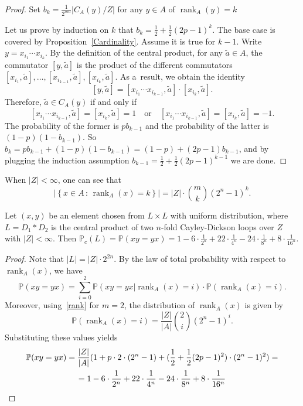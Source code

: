 \documentclass{jonasart}
\begin{document}
	\begin{proof}
		Set $b_k =\frac{1}{2^{mn}}|C_A (y)/Z|$ for any $y \in A$ of $\operatorname{rank}_A (y) = k$

		Let us prove by induction on $k$ that $b_k =\frac{1}{2}+\frac{1}{2}(2p-1)^k$. The base case is covered by Proposition~\ref{Cardinality}. Assume it is true for $k-1$. Write $y = x_{i_1}\cdots x_{i_k}$. By the definition of the central product, for any $\tilde{a} \in A$, the commutator $[y,\tilde{a}]$ is the product of the different commutators $[x_{i_1},\tilde{a}],\dots,[x_{i_{k-1}},\tilde{a}],[x_{i_k},\tilde{a}]$. As a~result, we obtain the identity
		\[
            [y,\tilde{a}] 
            = [x_{i_1}\cdots x_{i_{k-1}}, \tilde{a}] \cdot [x_{i_k},\tilde{a}].
        \]
        Therefore, $\tilde{a} \in C_A (y)$ if and only if 
        \[
            [x_{i_1}\cdots x_{i_{k-1}},\tilde{a}] 
            = [x_{i_k},\tilde{a}] = 1
            \quad \text{or} \quad
            [x_{i_1}\cdots x_{i_{k-1}},\tilde{a}] 
            = [x_{i_k},\tilde{a}] = -1.
        \]
        The probability of the former is $pb_{k-1}$ and the probability of the latter is $(1-p)(1-b_{k-1})$. So $b_k = pb_{k-1}+(1-p)(1-b_{k-1}) = (1-p)+(2p-1)b_{k-1}$, and by plugging the induction assumption $b_{k-1} = \frac{1}{2}+\frac{1}{2}(2p-1)^{k-1}$ we are done.
	\end{proof}

	When $|Z|<\infty$, one can see that
	\begin{equation}\label{rank}
		\tag{$\clubsuit$} |\left\{x \in A \, : \, \operatorname{rank}_A (x)=k\right\}| = |Z|\cdot \binom{m}{k}(2^{n}-1)^k.
	\end{equation}

	\begin{corollary}
		Let $(x,y)$ be an element chosen from $L\times L$ with uniform distribution, where $L=D_1 \ast D_2$ is the central product of two $n$-fold Cayley-Dickson loops over $Z$ with $|Z| < \infty$. Then $\mathbb{P}_c (L) = \mathbb{P}(xy=yx)=1-6\cdot\frac{1}{2^n}+22\cdot\frac{1}{4^n}-24\cdot\frac{1}{8^n}+8\cdot \frac{1}{16^n}$.
	\end{corollary}

	\begin{proof}
		Note that $|L| = |Z|\cdot2^{2n}$. By the law of total probability with respect to $\operatorname{rank}_A (x)$, we have
		\[
			\mathbb{P}(xy=yx) = \sum_{i=0}^{2} \mathbb{P}(xy=yx | \operatorname{rank}_A (x)=i) \cdot \mathbb{P}(\operatorname{rank}_A (x)=i).
		\]
		Moreover, using~\eqref{rank} for $m=2$, the distribution of $\operatorname{rank}_A (x)$ is given by
		\[
			\mathbb{P}(\operatorname{rank}_A (x)=i)=\frac{|Z|}{|A|}\binom{2}{i}(2^n -1)^i.
		\]
		Substituting these values yields
		\begin{gather*}
			\mathbb{P}(xy=yx) = \frac{|Z|}{|A|}(1+p \cdot2\cdot (2^n -1)+(\frac{1}{2}+\frac{1}{2}(2p-1)^2 )\cdot (2^n -1)^2 )= \\
			= 1-6\cdot\frac{1}{2^n}+22\cdot\frac{1}{4^n}-24\cdot\frac{1}{8^n}+8\cdot \frac{1}{16^n}
		\qedhere
		\end{gather*}
	\end{proof}
\end{document}
